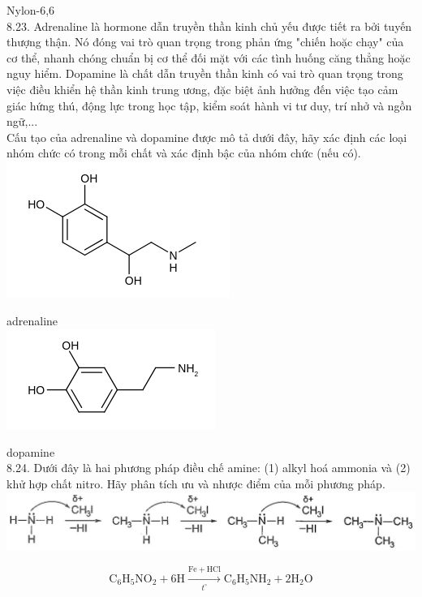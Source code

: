 \documentclass[10pt]{article}
\begin{document}
Nylon-6,6\\
8.23. Adrenaline là hormone dẫn truyền thần kinh chủ yếu được tiết ra bởi tuyến thượng thận. Nó đóng vai trò quan trọng trong phản ứng "chiến hoặc chạy" của cơ thể, nhanh chóng chuẩn bị cơ thể đối mặt với các tình huống căng thẳng hoặc nguy hiểm. Dopamine là chất dẫn truyền thần kinh có vai trò quan trọng trong việc điều khiển hệ thần kinh trung ương, đặc biệt ảnh hưởng đến việc tạo cảm giác hứng thú, động lực trong học tập, kiểm soát hành vi tư duy, trí nhở và ngồn ngữ,...\\
Cấu tạo của adrenaline và dopamine được mô tả dưới đây, hãy xác định các loại nhóm chức có trong mỗi chất và xác định bậc của nhóm chức (nếu có).\\
\includegraphics{smile-63685388f999004424d2de3d8986219fcaa90897}

adrenaline\\
\includegraphics{smile-8dfc794d3352ef25dd8ba550722a5db4bc375b06}

dopamine\\
8.24. Dưới đây là hai phương pháp điều chế amine: (1) alkyl hoá ammonia và (2) khử hợp chất nitro. Hãy phân tích ưu và nhược điểm của mỗi phương pháp.\\
\includegraphics[max width=\textwidth, center]{2025_10_23_74efce88ce3a451fd6b0g-026(2)}

$$
\mathrm{C}_{6} \mathrm{H}_{5} \mathrm{NO}_{2}+6 \mathrm{H} \xrightarrow[t^{\circ}]{\mathrm{Fe}+\mathrm{HCl}} \mathrm{C}_{6} \mathrm{H}_{5} \mathrm{NH}_{2}+2 \mathrm{H}_{2} \mathrm{O}
$$
\end{document}
